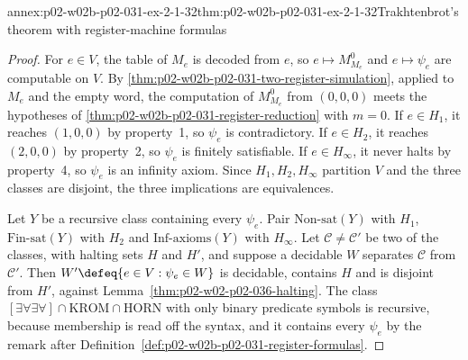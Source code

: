 \begin{annexitem}{annex:p02-w02b-p02-031-ex-2-1-32}{thm:p02-w02b-p02-031-ex-2-1-32}{Trakhtenbrot's theorem with register-machine formulas}
\begin{proof}
For \(e\in V\), the table of \(M_e\) is decoded from \(e\), so \(e\mapsto
M^{0}_{M_e}\) and \(e\mapsto\psi_e\) are computable on \(V\).  By
\cref{thm:p02-w02b-p02-031-two-register-simulation}, applied to \(M_e\) and the
empty word, the computation of \(M^{0}_{M_e}\) from \((0,0,0)\) meets the
hypotheses of \cref{thm:p02-w02b-p02-031-register-reduction} with \(m=0\).
If \(e\in H_1\), it reaches \((1,0,0)\) by property~1, so \(\psi_e\) is
contradictory.  If \(e\in H_2\), it reaches \((2,0,0)\) by property~2, so
\(\psi_e\) is finitely satisfiable.  If \(e\in H_\infty\), it never halts by
property~4, so \(\psi_e\) is an infinity axiom.  Since \(H_1,H_2,H_\infty\)
partition \(V\) and the three classes are disjoint, the three implications
are equivalences.

Let \(Y\) be a recursive class containing every \(\psi_e\).  Pair
\(\mathrm{Non\text{-}sat}(Y)\) with \(H_1\), \(\mathrm{Fin\text{-}sat}(Y)\)
with \(H_2\) and \(\mathrm{Inf\text{-}axioms}(Y)\) with \(H_\infty\).  Let
\(\mathcal C\neq\mathcal C'\) be two of the classes, with halting sets
\(H\) and \(H'\), and suppose a decidable \(W\) separates \(\mathcal C\) from
\(\mathcal C'\).  Then \(W'\defeq\{e\in V:\psi_e\in W\}\) is decidable,
contains \(H\) and is disjoint from \(H'\), against
Lemma~\ref{thm:p02-w02-p02-036-halting}.  The class
\([\exists\forall\exists\forall]\cap\mathrm{KROM}\cap\mathrm{HORN}\) with only
binary predicate symbols is recursive, because membership is read off the
syntax, and it contains every \(\psi_e\) by the remark after
Definition~\ref{def:p02-w02b-p02-031-register-formulas}.
\end{proof}
\end{annexitem}

